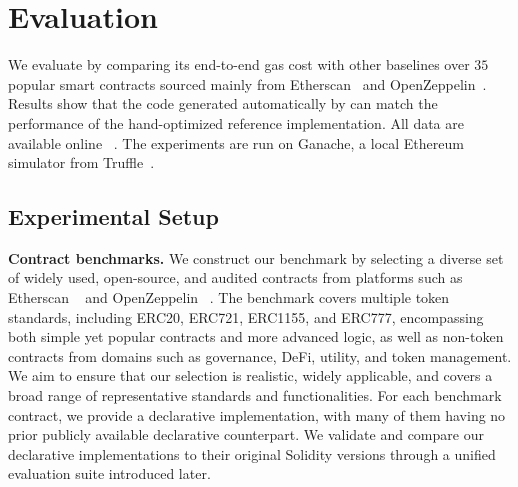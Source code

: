 \section{Evaluation}
\label{sec:evaluation}

We evaluate \proto by comparing its end-to-end gas cost with other baselines over $35$ popular smart contracts sourced mainly from Etherscan~\cite{etherscan} and OpenZeppelin~\cite{openZeppelin}.
Results show that the code generated automatically by \proto can match the performance of the hand-optimized reference implementation. 
All data are available online ~\cite{data}. The experiments are run on Ganache, a local Ethereum simulator from Truffle~\cite{truffle}.

\subsection{Experimental Setup}

\noindent\textbf{Contract benchmarks.}  
We construct our benchmark by selecting a diverse set of widely used, open-source, and audited contracts from platforms such as Etherscan ~\cite{etherscan} and OpenZeppelin ~\cite{openZeppelin}. The benchmark covers multiple token standards, including ERC20, ERC721, ERC1155, and ERC777, encompassing both simple yet popular contracts and more advanced logic, as well as non-token contracts from domains such as governance, DeFi, utility, and token management.
We aim to ensure that our selection is realistic, widely applicable, and covers a broad range of representative standards and functionalities.
For each benchmark contract, we provide a declarative implementation, with many of them having no prior publicly available declarative counterpart.
We validate and compare our declarative implementations to their original Solidity versions through a unified evaluation suite introduced later.


